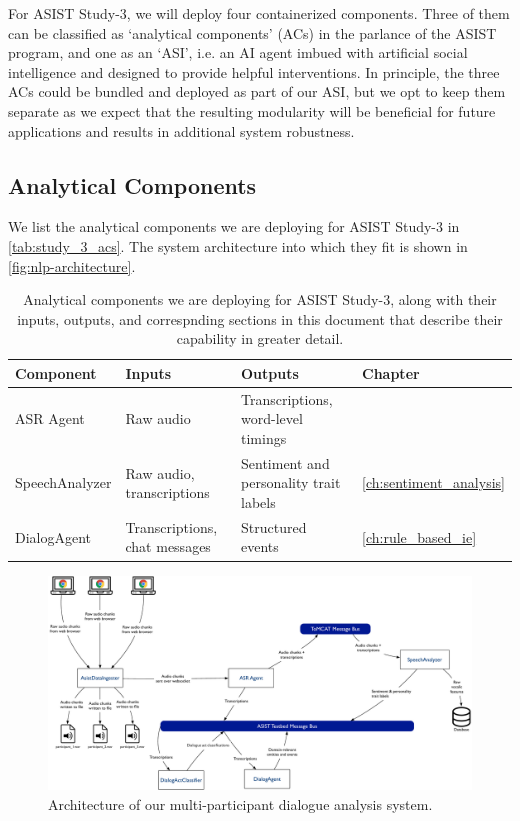 For ASIST Study-3, we will deploy four containerized components. Three of them
can be classified as `analytical components' (ACs) in the parlance of the ASIST
program, and one as an `ASI', i.e. an AI agent imbued with artificial social
intelligence and designed to provide helpful interventions. In principle, the
three ACs could be bundled and deployed as part of our ASI, but we opt to keep
them separate as we expect that the resulting modularity will be beneficial for
future applications and results in additional system robustness.


\subsection{Analytical Components}

We list the analytical components we are deploying for ASIST Study-3 in
\autoref{tab:study_3_acs}. The system architecture into which they fit is shown
in \autoref{fig:nlp-architecture}.

\begin{table}
    \small
    \begin{tabularx}{5.5in}{llXl}
        \toprule
        Component           & Inputs                        & Outputs                                & Chapter\\\midrule
        ASR Agent           & Raw audio                     & Transcriptions, word-level timings     & \\
        SpeechAnalyzer      & Raw audio, transcriptions     & Sentiment and personality trait labels & \autoref{ch:sentiment_analysis}\\
        DialogAgent         & Transcriptions, chat messages & Structured events                      & \autoref{ch:rule_based_ie}\\
        \bottomrule
    \end{tabularx}
    \caption{%
        Analytical components we are deploying for ASIST Study-3, along with
        their inputs, outputs, and correspnding sections in this document that
        describe their capability in greater detail.
    }
    \label{tab:study_3_acs}
\end{table}


\begin{figure}
    \centering
    \includegraphics[width=6in]{../images/nlp_architecture}
    \caption{Architecture of our multi-participant dialogue analysis system.}
    \label{fig:nlp-architecture}
\end{figure}

